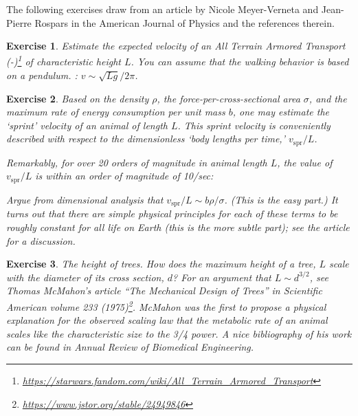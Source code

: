 \documentclass[
  11pt,
	colorful,
	raggedright,
]{tufte-style-thesis-flip}
\newtheorem{exercise}{Exercise}[section]
\begin{document}
The following exercises draw from an article by Nicole Meyer-Verneta and Jean-Pierre Rospars in the American Journal of Physics and the references therein.
 \begin{exercise}
 Estimate the expected velocity of an All Terrain Armored Transport (-)\footnote{\url{https://starwars.fandom.com/wiki/All_Terrain_Armored_Transport}} of characteristic height $L$. You can assume that the walking behavior is based on a pendulum. : $v \sim \sqrt{Lg}/2\pi$.
 \end{exercise}

 \begin{exercise}
 Based on the density $\rho$, the force-per-cross-sectional area $\sigma$, and the maximum rate of energy consumption per unit mass $b$, one may estimate the `sprint' velocity of an animal of length $L$. This sprint velocity is conveniently described with respect to the dimensionless `body lengths per time,' $v_\text{spr}/L$.

Remarkably, for over 20 orders of magnitude in animal length $L$, the value of $v_\text{spr}/L$ is within an order of magnitude of 10/sec:


Argue from dimensional analysis that $v_\text{spr}/L \sim b\rho/\sigma$. (This is the easy part.) It turns out that there are simple physical principles for each of these terms to be roughly constant for all life on Earth (this is the more subtle part); see the article for a discussion.
\end{exercise}

\begin{exercise}
The height of trees. How does the maximum height of a tree, $L$ scale with the diameter of its cross section, $d$? For an argument that $L\sim d^{3/2}$, see Thomas McMahon's article ``The Mechanical Design of Trees'' in \emph{Scientific American} volume 233 (1975)\footnote{\url{https://www.jstor.org/stable/24949846}}. McMahon was the first to propose a physical explanation for the observed scaling law that the metabolic rate of an animal scales like the characteristic size to the 3/4 power. A nice bibliography of his work can be found in \emph{Annual Review of Biomedical Engineering}.~
\end{exercise}
\end{document}
